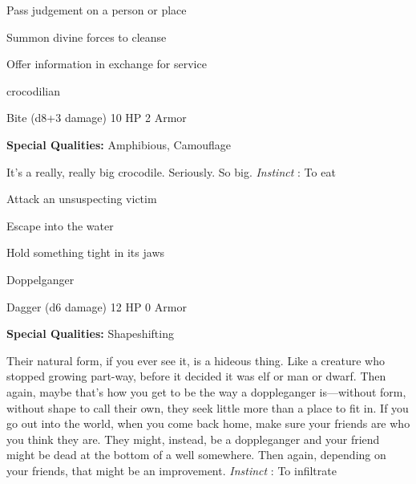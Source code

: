 \startitemize[1,packed]

\item Pass judgement on a person or place

 
\item Summon divine forces to cleanse

 
\item Offer information in exchange for service


\stopitemize
 
\startMonsterName
crocodilian	 
\stopMonsterName
 

Bite (d8+3 damage)	10 HP	2 Armor

 


 
\startMonsterQualities
{\bf Special Qualities:}  Amphibious, Camouflage
\stopMonsterQualities
 
\startMonsterDescription
It’s a really, really big crocodile. Seriously. So big. {\em Instinct} : To eat
\stopMonsterDescription
 
\startitemize[1,packed]

\item Attack an unsuspecting victim

 
\item Escape into the water

 
\item Hold something tight in its jaws


\stopitemize
 
\startMonsterName
Doppelganger	 
\stopMonsterName
 

Dagger (d6 damage)	12 HP	0 Armor

 


 
\startMonsterQualities
{\bf Special Qualities:}  Shapeshifting
\stopMonsterQualities
 
\startMonsterDescription
Their natural form, if you ever see it, is a hideous thing. Like a creature who stopped growing part-way, before it decided it was elf or man or dwarf. Then again, maybe that’s how you get to be the way a doppleganger is—without form, without shape to call their own, they seek little more than a place to fit in. If you go out into the world, when you come back home, make sure your friends are who you think they are. They might, instead, be a doppleganger and your friend might be dead at the bottom of a well somewhere. Then again, depending on your friends, that might be an improvement. {\em Instinct} : To infiltrate
\stopMonsterDescription
 
